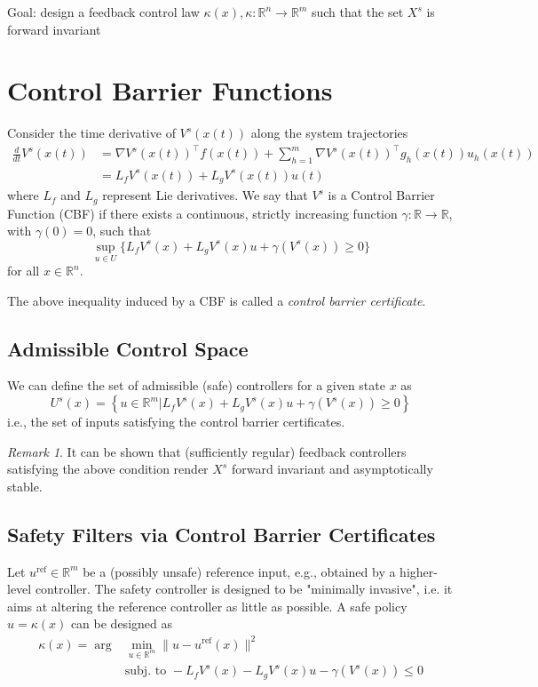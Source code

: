 \documentclass{book}
\newcommand{\R}{\mathbb{R}}
\theoremstyle{theoremv2}
\theoremstyle{defv2}
\theoremstyle{remark}
\newtheorem*{remark}{Remark}
\theoremstyle{remark}
\theoremstyle{definition}
\theoremstyle{definition}
\begin{document}
Goal: design a feedback control law $\kappa(x),\kappa:\R^n\to\R^m$ such that the set $X^s$ is forward invariant

\section{Control Barrier Functions}
Consider the time derivative of $V^s(x(t))$ along the system trajectories
\begin{align*}
    \displaystyle\frac{d}{dt}V^s(x(t)) &= \nabla V^s(x(t))^\top f(x(t)) + \displaystyle\sum_{h=1}^{m}\nabla V^s(x(t))^\top g_h(x(t))u_h(x(t))\\
                                       &= L_fV^s(x(t)) + L_gV^s(x(t))u(t)
\end{align*}
where $L_f$ and $L_g$ represent Lie derivatives.
We say that $V^s$ is a Control Barrier Function (CBF) if there exists a continuous, strictly increasing function $\gamma:\R\to\R$, with $\gamma(0)=0$, such that 
\[
    \sup_{u\in U}\{ L_fV^s(x) + L_gV^s(x)u + \gamma(V^s(x))\geq 0 \}
\]
for all $x\in\R^n$.

The above inequality induced by a CBF is called a \emph{control barrier certificate}.
\subsection{Admissible Control Space}
We can define the set of admissible (safe) controllers for a given state $x$ as 
\[
    U^s(x) = \left\{ u\in\R^m | L_fV^s(x) + L_gV^s(x)u + \gamma(V^s(x))\geq 0 \right\}
\]
i.e., the set of inputs satisfying the control barrier certificates. 
\begin{remark}
    It can be shown that (sufficiently regular) feedback controllers satisfying the above condition render $X^s$ forward invariant and asymptotically stable.
\end{remark}

\subsection{Safety Filters via Control Barrier Certificates}
Let $u^\text{ref}\in\R^m$ be a (possibly unsafe) reference input, e.g., obtained by a higher-level controller. The safety controller is designed to be "minimally invasive", i.e. it aims at altering the reference controller as little as possible. A safe policy $u = \kappa(x)$ can be designed as 
\begin{align*}
    \kappa(x) = \arg &\min_{u\in\R^m} \|u-u^\text{ref}(x)\|^2\\
                     &\text{subj. to } -L_fV^s(x) - L_gV^s(x)u - \gamma(V^s(x))\leq 0
\end{align*}
\end{document}
